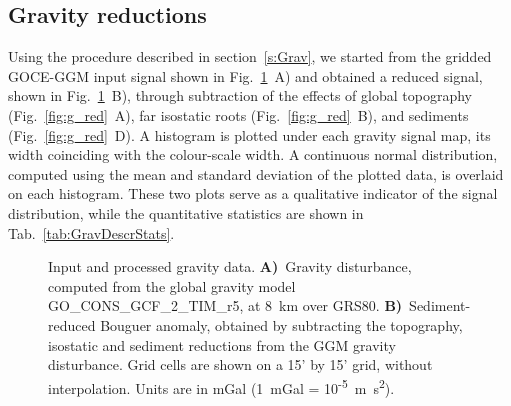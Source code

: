 {\subsection{Gravity reductions}
\label{ss:Appl:DiscGravReductions}

Using the procedure described in section~\ref{s:Grav}, we started from the gridded GOCE-GGM input signal shown in Fig.~\ref{fig:GGMmerged}~A) and obtained a reduced signal, shown in Fig.~\ref{fig:GGMmerged}~B), through subtraction of the effects of global topography (Fig.~\ref{fig:g_red}~A), far isostatic roots (Fig.~\ref{fig:g_red}~B), and sediments (Fig.~\ref{fig:g_red}~D).
A histogram is plotted under each gravity signal map, its width coinciding with the colour-scale width.
A continuous normal distribution, computed using the mean and standard deviation of the plotted data, is overlaid on each histogram.
These two plots serve as a qualitative indicator of the signal distribution, while the quantitative statistics are shown in Tab.~\ref{tab:GravDescrStats}.

\begin{figure}
    \begin{adjustbox}{center}
    \end{adjustbox}
	\caption{Input and processed gravity data.
	\textbf{A)}~Gravity disturbance, computed from the global gravity model {GO\_CONS\_GCF\_2\_TIM\_r5}, at 8~km over GRS80.
	\textbf{B)}~Sediment-reduced Bouguer anomaly, obtained by subtracting the topography, isostatic and sediment reductions from the GGM gravity disturbance.
	Grid cells are shown on a 15' by 15' grid, without interpolation. Units are in mGal (1~mGal = 10\textsuperscript{-5}~m~s\textsuperscript{2}).}
	\label{fig:GGMmerged}
\end{figure}

}

